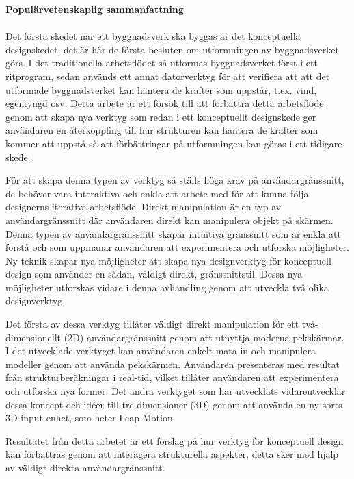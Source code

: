 \null\vfill

{\Huge \textbf{Populärvetenskaplig sammanfattning}} \\ \\

Det första skedet när ett byggnadsverk ska byggas är det konceptuella designskedet, det är här de första besluten om utformningen av byggnadsverket görs. I det traditionella arbetsflödet så utformas byggnadsverket först i ett ritprogram, sedan används ett annat datorverktyg för att verifiera att att det utformade byggnadsverket kan hantera de krafter som uppstår, t.ex. vind, egentyngd osv. Detta arbete är ett försök till att förbättra detta arbetsflöde genom att skapa nya verktyg som redan i ett konceptuellt designskede ger användaren en återkoppling till hur strukturen kan hantera de krafter som kommer att uppstå så att förbättringar på utformningen kan göras i ett tidigare skede.

För att skapa denna typen av verktyg så ställs höga krav på användargränssnitt, de behöver vara interaktiva och enkla att arbete med för att kunna följa designerns iterativa arbetsflöde. Direkt manipulation är en typ av användargränssnitt där användaren direkt kan manipulera objekt på skärmen. Denna typen av användargränssnitt skapar intuitiva gränssnitt som är enkla att förstå och som uppmanar användaren att experimentera och utforska möjligheter.  Ny teknik skapar nya möjligheter att skapa nya designverktyg för konceptuell design som använder en sådan, väldigt direkt, gränssnittstil. Dessa nya möjligheter utforskas vidare i denna avhandling genom att utveckla två olika designverktyg.

Det första av dessa verktyg tillåter väldigt direkt manipulation för ett två-dimensionellt (2D) användargränssnitt genom att utnyttja moderna pekskärmar. I det utvecklade verktyget kan användaren enkelt mata in och manipulera modeller genom att använda pekskärmen. Användaren presenteras med resultat från strukturberäkningar i real-tid, vilket tillåter användaren att experimentera och utforska nya former. Det andra verktyget som har utvecklats vidareutvecklar dessa koncept och idéer till tre-dimensioner (3D) genom att använda en ny sorts 3D input enhet, som heter Leap Motion.

Resultatet från detta arbetet är ett förslag på hur verktyg för konceptuell design kan förbättras genom att interagera strukturella aspekter, detta sker med hjälp av väldigt direkta användargränssnitt.


\vfill\vfill\vfill\vfill\null